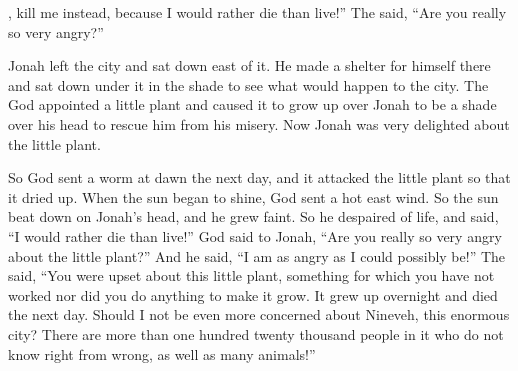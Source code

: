 {{}, kill
me instead,
because
I would rather
die
than live!”
The
{}
said,
“Are you really
so very angry?”
\par }{\PP {}Jonah
left
the city
and sat
down east
of it. He made
a shelter
for himself there
and sat
down under
it in the shade
to
see
what
would happen
to the city.
The
{}
God
appointed
a little plant
and caused it to grow up
over
Jonah
to be
a shade
over
his head
to rescue
him
from his misery.
Now Jonah
was very delighted
about the little plant.
\par }{\PP {}So God
sent
a worm
at dawn
the next day,
and it attacked
the little plant
so that it dried up.
When the sun
began
to shine,
God
sent a hot
east
wind.
So the sun
beat down
on
Jonah’s
head,
and he grew faint.
So he despaired
of life,
and said,
“I would rather
die
than
live!”
God
said
to
Jonah,
“Are you really
so very angry
about the little plant?” And he said,
“I am as angry
as
I could possibly be!”
The
{}
said,
“You
were upset
about this little plant,
something for
which
you have not
worked
nor
did you do anything to make it grow.
It grew up
overnight
and died
the next day.
Should I
not
be even more concerned
about Nineveh,
this enormous
city? There are
more
than one hundred twenty thousand
people
in it who
do not
know
right
from wrong,
as well as many
animals!”
\par }